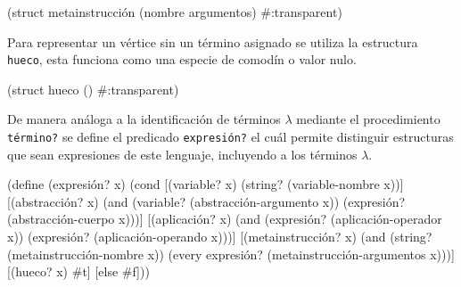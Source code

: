 \documentclass[letterpaper,twoside,openright,11pt]{book}
\begin{document}
\nwenddocs{}\plusendmoddef
(struct metainstrucción (nombre argumentos) #:transparent)

\eatline
{}\nwendcode{}\nwdocspar

Para representar un vértice sin un término asignado se utiliza la estructura {\tt{}\protect{}hueco}, esta funciona como una especie de comodín o valor nulo.


\nwenddocs{}\plusendmoddef
(struct hueco () #:transparent)

\eatline
{}\nwendcode{}\nwdocspar


De manera análoga a la identificación de términos \( λ \) mediante el procedimiento {\tt{}\protect{}término?} se define el predicado {\tt{}\protect{}expresión?} el cuál permite distinguir estructuras que sean expresiones de este lenguaje, incluyendo a los términos \( λ \).

\nwenddocs{}\plusendmoddef
(define (expresión? x)
  (cond
   [(variable? x)        (string? (variable-nombre x))]
   [(abstracción? x)     (and (variable? (abstracción-argumento x))
                              (expresión? (abstracción-cuerpo x)))]
   [(aplicación? x)      (and (expresión? (aplicación-operador x))
                              (expresión? (aplicación-operando x)))]
   [(metainstrucción? x) (and (string? (metainstrucción-nombre x))
                              (every expresión? (metainstrucción-argumentos x)))]
   [(hueco? x)           #t]
   [else                 #f]))

\eatline
{}\nwendcode{}\nwdocspar
\end{document}
